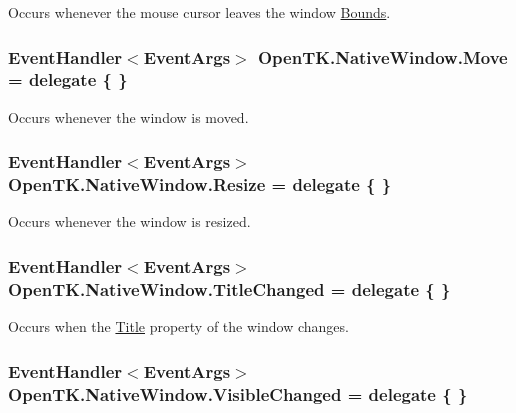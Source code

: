 Occurs whenever the mouse cursor leaves the window \hyperlink{class_open_t_k_1_1_native_window_ac0325973134062eba62484df45236464}{Bounds}. 

\hypertarget{class_open_t_k_1_1_native_window_aab24c27eb84152880e401b0c74718ce8}{
\subsubsection[{Move}]{\setlength{\rightskip}{0pt plus 5cm}Event\-Handler$<$Event\-Args$>$ Open\-T\-K.\-Native\-Window.\-Move = delegate \{ \}}}\label{class_open_t_k_1_1_native_window_aab24c27eb84152880e401b0c74718ce8}


Occurs whenever the window is moved. 

\hypertarget{class_open_t_k_1_1_native_window_a4fac914cf3df915f63f5de6f856bdfe6}{
\subsubsection[{Resize}]{\setlength{\rightskip}{0pt plus 5cm}Event\-Handler$<$Event\-Args$>$ Open\-T\-K.\-Native\-Window.\-Resize = delegate \{ \}}}\label{class_open_t_k_1_1_native_window_a4fac914cf3df915f63f5de6f856bdfe6}


Occurs whenever the window is resized. 

\hypertarget{class_open_t_k_1_1_native_window_a25393018b81b7d842548407749b338cb}{
\subsubsection[{Title\-Changed}]{\setlength{\rightskip}{0pt plus 5cm}Event\-Handler$<$Event\-Args$>$ Open\-T\-K.\-Native\-Window.\-Title\-Changed = delegate \{ \}}}\label{class_open_t_k_1_1_native_window_a25393018b81b7d842548407749b338cb}


Occurs when the \hyperlink{class_open_t_k_1_1_native_window_af5cd587c921ef6c10709fc69a1e2900b}{Title} property of the window changes. 

\hypertarget{class_open_t_k_1_1_native_window_af1678140a475ad9076116260b76fb98e}{
\subsubsection[{Visible\-Changed}]{\setlength{\rightskip}{0pt plus 5cm}Event\-Handler$<$Event\-Args$>$ Open\-T\-K.\-Native\-Window.\-Visible\-Changed = delegate \{ \}}}\label{class_open_t_k_1_1_native_window_af1678140a475ad9076116260b76fb98e}


